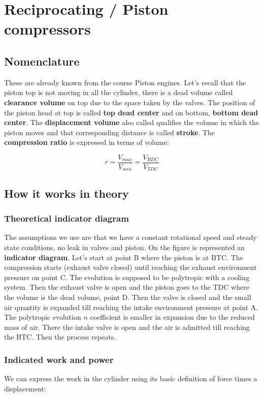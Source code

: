 \section{Reciprocating / Piston compressors}
\subsection{Nomenclature}

These are already known from the course Piston engines. Let's recall that the piston top is not moving in all the cylinder, there is a dead volume called \textbf{clearance volume} on top due to the space taken by the valves. The position of the piston head at top is called \textbf{top dead center} and on bottom, \textbf{bottom dead center}. The \textbf{displacement volume} also called qualifies the volume in which the piston moves and that corresponding distance is called \textbf{stroke}. The \textbf{compression ratio} is expressed in terms of volume: 

\begin{equation}
r = \frac{V_{max}}{V_{min}} = \frac{V_{BDC}}{V_{TDC}}
\end{equation}

\subsection{How it works in theory}
\subsubsection{Theoretical indicator diagram}
The assumptions we use are that we have a constant rotational speed and steady state conditions, no leak in valves and piston. On the figure is represented an \textbf{indicator diagram}. Let's start at point B where the piston is at BTC. The compression starts (exhaust valve closed) until reaching the exhaust environment pressure on point C. The evolution is supposed to be polytropic with a cooling system. Then the exhaust valve is open and the piston goes to the TDC where the volume is the dead volume, point D. Then the valve is closed and the small air quantity is expanded till reaching the intake environment pressure at point A. The polytropic evolution $n$ coefficient is smaller in expansion due to the reduced mass of air. There the intake valve is open and the air is admitted till reaching the BTC. Then the process repeats.

\subsubsection{Indicated work and power}
We can express the work in the cylinder using its basic definition of force times a displacement: 

